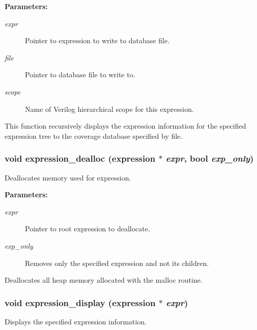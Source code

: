 \begin{Desc}
\item[{\bf Parameters: }]\par
\begin{description}
\item[
{\em expr}]Pointer to expression to write to database file. \item[
{\em file}]Pointer to database file to write to. \item[
{\em scope}]Name of Verilog hierarchical scope for this expression.

\end{description}
\end{Desc}
This function recursively displays the expression information for the specified expression tree to the coverage database specified by file. 
\subsubsection{\setlength{\rightskip}{0pt plus 5cm}void expression\_\-dealloc ({\bf expression} $\ast$ {\em expr}, {\bf bool} {\em exp\_\-only})}\label{expr_8c_a23}


Deallocates memory used for expression.

\begin{Desc}
\item[{\bf Parameters: }]\par
\begin{description}
\item[
{\em expr}]Pointer to root expression to deallocate. \item[
{\em exp\_\-only}]Removes only the specified expression and not its children.

\end{description}
\end{Desc}
Deallocates all heap memory allocated with the malloc routine. 
\subsubsection{\setlength{\rightskip}{0pt plus 5cm}void expression\_\-display ({\bf expression} $\ast$ {\em expr})}\label{expr_8c_a18}


Displays the specified expression information.

